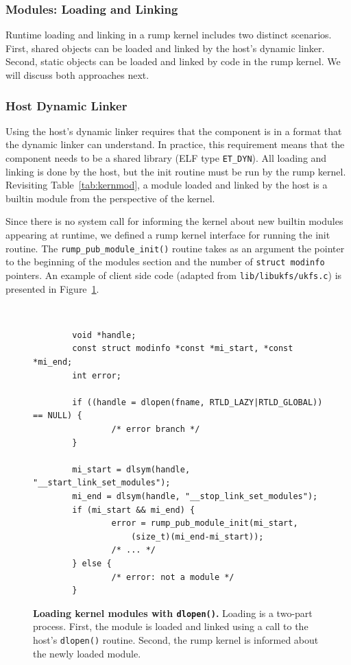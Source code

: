\subsubsection{Modules: Loading and Linking}

Runtime loading and linking in a rump kernel includes two distinct
scenarios.  First, shared objects can be loaded and linked by the
host's dynamic linker.  Second, static objects can be loaded and
linked by code in the rump kernel.  We will discuss both approaches
next.

\subsubsection*{Host Dynamic Linker}

Using the host's dynamic linker requires that the component is in
a format that the dynamic linker can understand.  In practice, this
requirement means that the component needs to be a shared library
(ELF type \verb+ET_DYN+).  All loading and linking is done by the
host, but the init routine must be run by the rump kernel.  Revisiting
Table~\ref{tab:kernmod}, a module loaded and linked by the host is a
builtin module from the perspective of the kernel.

Since there is no system call for informing the kernel about new
builtin modules appearing at runtime, we defined a rump kernel
interface for running the init routine.  The \verb+rump_pub_module_init()+
routine takes as an argument the pointer to the beginning of the modules
section and the number of \texttt{struct modinfo} pointers.
An example of client side code (adapted from \texttt{lib/libukfs/ukfs.c})
is presented in Figure~\ref{fig:dlopen}.

\begin{figure}[t]
{\tt \scriptsize  
\begin{verbatim}
        void *handle;
        const struct modinfo *const *mi_start, *const *mi_end;
        int error;

        if ((handle = dlopen(fname, RTLD_LAZY|RTLD_GLOBAL)) == NULL) {
                /* error branch */
        }

        mi_start = dlsym(handle, "__start_link_set_modules");
        mi_end = dlsym(handle, "__stop_link_set_modules");
        if (mi_start && mi_end) {
                error = rump_pub_module_init(mi_start,
                    (size_t)(mi_end-mi_start));
                /* ... */
        } else {
                /* error: not a module */
        }
\end{verbatim}}
\caption[Loading kernel modules with \texttt{dlopen()}]{
\textbf{Loading kernel modules with \texttt{dlopen()}.}
Loading is a two-part process.  First, the module is loaded and linked
using a call to the host's \texttt{dlopen()} routine.  Second, the
rump kernel is informed about the newly loaded module.
}
\label{fig:dlopen}
\end{figure}


